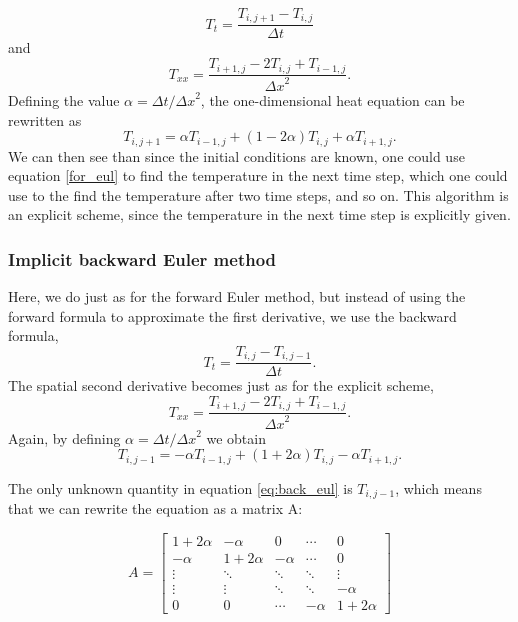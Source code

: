 \documentclass{article}
\begin{document}
\begin{multicols}{2}
\begin{equation}
	T_t=\frac{T_{i,j+1}-T_{i,j}}{\Delta t}
\end{equation}
and
\begin{equation}
	T_{xx}=\frac{T_{i+1,j}-2T_{i,j}+ T_{i-1,j}}{{\Delta x}^2}.
\end{equation}
Defining the value $\alpha = \Delta t/ {\Delta x}^2 $, the one-dimensional heat equation can be rewritten as
\begin{equation}
	T_{i,j+1}=\alpha T_{i-1,j}+(1-2\alpha )T_{i,j} + \alpha T_{i+1, j}. \label{for_eul}
\end{equation}
We can then see than since the initial conditions are known, one could use equation \eqref{for_eul} to find the temperature in the next time step, which one could use to the find the temperature after two time steps, and so on. This algorithm is an explicit scheme, since the temperature in the next time step is explicitly given. 

\subsubsection{Implicit backward Euler method}

Here, we do just as for the forward Euler method, but instead of using the forward formula to approximate the first derivative, we use the backward formula,
\begin{equation}
T_t=\frac{T_{i,j}-T_{i,j-1}}{\Delta t}.
\end{equation}
The spatial second derivative becomes just as for the explicit scheme, 
\begin{equation}
T_{xx}=\frac{T_{i+1,j}-2T_{i,j}+ T_{i-1,j}}{{\Delta x}^2}.
\end{equation}
Again, by defining $\alpha = \Delta t/ {\Delta x}^2$ we obtain
\begin{equation}
T_{i,j-1}=-\alpha T_{i-1,j}+(1+2\alpha )T_{i,j} - \alpha T_{i+1, j}. \label{eq:back_eul}
\end{equation}

The only unknown quantity in equation \ref{eq:back_eul} is $T_{i,j-1}$, which means that we can rewrite the equation as a matrix A:

\begin{equation}
A = 
\begin{bmatrix}
1+2\alpha & -\alpha & 0 & \cdots & 0 \\
-\alpha & 1+2\alpha & -\alpha & \cdots & 0  \\
\vdots  & \ddots  & \ddots & \ddots & \vdots  \\
\vdots  & \vdots  & \ddots & \ddots & -\alpha  \\
0 & 0 & \cdots & -\alpha & 1+2\alpha
\end{bmatrix}
\end{equation}


\end{multicols}
\end{document}
